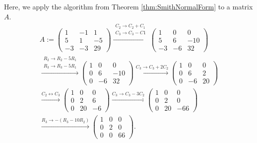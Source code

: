 \documentclass[../algebraNotesMSRI-UP2016.tex]{subfiles}
\begin{document}
\begin{frame}{}{}
\begin{ex}\label{ex:diagonalAlgorithm}
Here, we apply the algorithm from Theorem \ref{thm:SmithNormalForm} to a matrix $A$.
\begin{multline*}
A:=\begin{pmatrix}
	1 & -1 & 1 \\
	5 & 1 & -5 \\
	-3 & -3 & 29 
	\end{pmatrix}\xrightarrow{\substack{C_2\to C_2+C_1 \\ C_3\to C_3-C1}}
\begin{pmatrix}
1 & 0 & 0 \\
5 & 6 & -10 \\
-3 & -6 & 32 
\end{pmatrix} \\
\xrightarrow{\substack{R_2\to R_2-5R_1 \\ R_3\to R_3-5R_1}}
\begin{pmatrix}
1 & 0 & 0 \\
0 & 6 & -10 \\
0 & -6 & 32
\end{pmatrix}\xrightarrow{C_3\to C_3+2C_2}
\begin{pmatrix}
1 & 0 & 0 \\
0 & 6 & 2 \\
0 & -6 & 20
\end{pmatrix} 
\\ \xrightarrow{C_2\leftrightarrow C_3}
\begin{pmatrix}
1 & 0 & 0 \\
0 & 2 & 6 \\
0 & 20 & -6
\end{pmatrix}\xrightarrow{C_3\to C_3-3C_2}
\begin{pmatrix}
1 & 0 & 0 \\
0 & 2 & 0 \\
0 & 20 & -66
\end{pmatrix} \\
\xrightarrow{R_3\to -(R_3-10R_2)}
\begin{pmatrix}
1 & 0 & 0 \\
0 & 2 & 0 \\
0 & 0 & 66
\end{pmatrix}.
\end{multline*}
\end{ex}
\end{frame}
\end{document}
